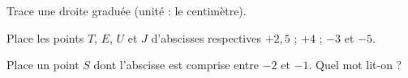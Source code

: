\begin{myenumerate}
  \item Trace une droite graduée (unité : le centimètre).
  \item Place les points $T$, $E$, $U$ et $J$ d'abscisses respectives $+2,5$ ; $+4$ ; $-3$ et $-5$.
  \item Place un point $S$ dont l'abscisse est comprise entre $-2$ et $-1$. Quel mot lit-on ?
\end{myenumerate}